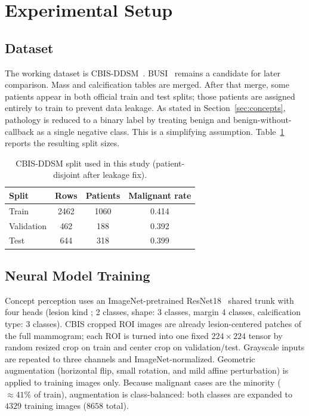 \section{Experimental Setup}
\label{sec:experiments}

\subsection{Dataset}
\label{sec:dataset}

The working dataset is CBIS-DDSM~\cite{lee2017cbis}. BUSI~\cite{aldhabyani2020busi} remains a candidate for later comparison. Mass and calcification tables are merged. After that merge, some patients appear in both official train and test splits; those patients are assigned entirely to train to prevent data leakage. As stated in Section~\ref{sec:concepts}, pathology is reduced to a binary label by treating benign and benign-without-callback as a single negative class. This is a simplifying assumption. Table~\ref{tab:dataset} reports the resulting split sizes.

\begin{table}[!t]
\caption{CBIS-DDSM split used in this study (patient-disjoint after leakage fix).}
\label{tab:dataset}
\centering
\small
\begin{tabular}{@{}lccc@{}}
\toprule
Split & Rows & Patients & Malignant rate \\
\midrule
Train & 2462 & 1060 & 0.414 \\
Validation & 462 & 188 & 0.392 \\
Test & 644 & 318 & 0.399 \\
\bottomrule
\end{tabular}
\end{table}

\subsection{Neural Model Training}
\label{sec:neural}

Concept perception uses an ImageNet-pretrained ResNet18~\cite{he2016resnet} shared trunk with four heads (lesion kind
; 2 classes, shape: 3 classes, margin 4 classes, calcification type: 3 classes). CBIS cropped ROI images are already lesion-centered patches of the full mammogram; each ROI is turned into one fixed $224\times 224$ tensor by random resized crop on train and center crop on validation/test. Grayscale inputs are repeated to three channels and ImageNet-normalized. Geometric augmentation (horizontal flip, small rotation, and mild affine perturbation) is applied to training images only. Because malignant cases are the minority ($\approx 41\%$ of train), augmentation is class-balanced: both classes are expanded to $4329$ training images ($8658$ total).

